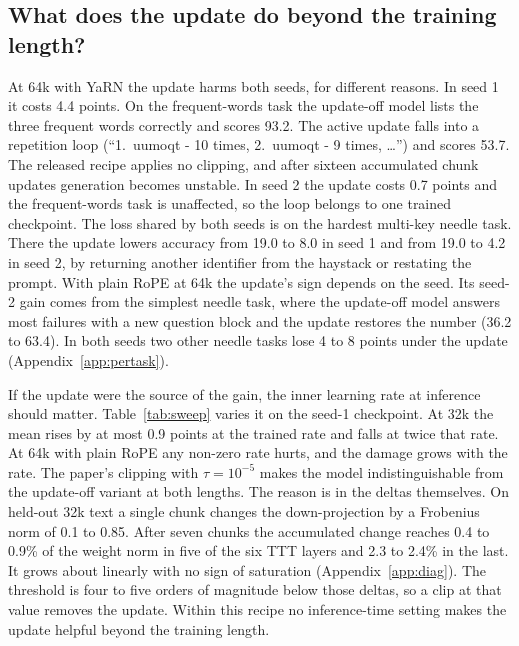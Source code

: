 \documentclass{article}
\begin{document}
\subsection{What does the update do beyond the training length?}

At 64k with YaRN the update harms both seeds, for different reasons. In seed 1 it costs 4.4 points. On the frequent-words task the update-off model lists the three frequent words correctly and scores 93.2. The active update falls into a repetition loop (``1.\ uumoqt - 10 times, 2.\ uumoqt - 9 times, \dots'') and scores 53.7. The released recipe applies no clipping, and after sixteen accumulated chunk updates generation becomes unstable. In seed 2 the update costs 0.7 points and the frequent-words task is unaffected, so the loop belongs to one trained checkpoint. The loss shared by both seeds is on the hardest multi-key needle task. There the update lowers accuracy from 19.0 to 8.0 in seed 1 and from 19.0 to 4.2 in seed 2, by returning another identifier from the haystack or restating the prompt. With plain RoPE at 64k the update's sign depends on the seed. Its seed-2 gain comes from the simplest needle task, where the update-off model answers most failures with a new question block and the update restores the number (36.2 to 63.4). In both seeds two other needle tasks lose 4 to 8 points under the update (Appendix~\ref{app:pertask}).

If the update were the source of the gain, the inner learning rate at inference should matter. Table~\ref{tab:sweep} varies it on the seed-1 checkpoint. At 32k the mean rises by at most 0.9 points at the trained rate and falls at twice that rate. At 64k with plain RoPE any non-zero rate hurts, and the damage grows with the rate. The paper's clipping with $\tau = 10^{-5}$ makes the model indistinguishable from the update-off variant at both lengths. The reason is in the deltas themselves. On held-out 32k text a single chunk changes the down-projection by a Frobenius norm of 0.1 to 0.85. After seven chunks the accumulated change reaches 0.4 to 0.9\% of the weight norm in five of the six TTT layers and 2.3 to 2.4\% in the last. It grows about linearly with no sign of saturation (Appendix~\ref{app:diag}). The threshold is four to five orders of magnitude below those deltas, so a clip at that value removes the update. Within this recipe no inference-time setting makes the update helpful beyond the training length.
\end{document}
